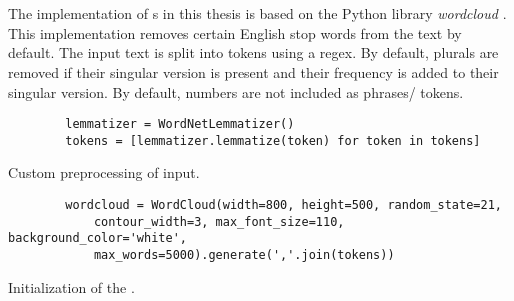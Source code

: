 \section{\wordcloud{}}\label{sec:impl-wordcloud}

The implementation of \wordcloud{}s in this thesis is based on the Python library \textit{wordcloud} \cite{wordcloud-dev}.
This implementation removes certain English stop words from the text by default.
The input text is split into tokens using a regex.
By default, plurals are removed if their singular version is present and their frequency is added to their singular version.
By default, numbers are not included as phrases/ tokens.

\begin{listing}[htp]
    \begin{verbatim}
        lemmatizer = WordNetLemmatizer()
        tokens = [lemmatizer.lemmatize(token) for token in tokens]
    \end{verbatim}
    \caption{Custom preprocessing of \wordcloud{} input.
    }
    \label{lst:impl-preproc-wordcloud}
\end{listing}

\begin{listing}[htp]
    \begin{verbatim}
        wordcloud = WordCloud(width=800, height=500, random_state=21, 
            contour_width=3, max_font_size=110, background_color='white', 
            max_words=5000).generate(','.join(tokens))
    \end{verbatim}
    \caption{Initialization of the \wordcloud{}.
    }
    \label{lst:impl-preproc-wordcloud}
\end{listing}

